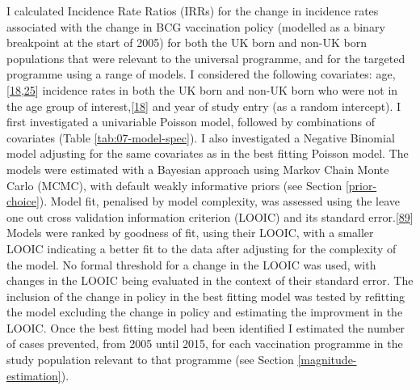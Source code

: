 \documentclass[11pt,twoside]{bristolthesis}
\begin{document}
  I calculated Incidence Rate Ratios (IRRs) for the change in incidence rates associated with the change in BCG vaccination policy (modelled as a binary breakpoint at the start of 2005) for both the UK born and non-UK born populations that were relevant to the universal programme, and for the targeted programme using a range of models. I considered the following covariates: age,{[}\protect\hyperlink{ref-PHE2016a}{18},\protect\hyperlink{ref-Zwerling2011}{25}{]} incidence rates in both the UK born and non-UK born who were not in the age group of interest,{[}\protect\hyperlink{ref-PHE2016a}{18}{]} and year of study entry (as a random intercept). I first investigated a univariable Poisson model, followed by combinations of covariates (Table \ref{tab:07-model-spec}). I also investigated a Negative Binomial model adjusting for the same covariates as in the best fitting Poisson model. The models were estimated with a Bayesian approach using Markov Chain Monte Carlo (MCMC), with default weakly informative priors (see Section \ref{prior-choice}). Model fit, penalised by model complexity, was assessed using the leave one out cross validation information criterion (LOOIC) and its standard error.{[}\protect\hyperlink{ref-Vehtari2016}{89}{]} Models were ranked by goodness of fit, using their LOOIC, with a smaller LOOIC indicating a better fit to the data after adjusting for the complexity of the model. No formal threshold for a change in the LOOIC was used, with changes in the LOOIC being evaluated in the context of their standard error. The inclusion of the change in policy in the best fitting model was tested by refitting the model excluding the change in policy and estimating the improvment in the LOOIC. Once the best fitting model had been identified I estimated the number of cases prevented, from 2005 until 2015, for each vaccination programme in the study population relevant to that programme (see Section \ref{magnitude-estimation}).
\end{document}
